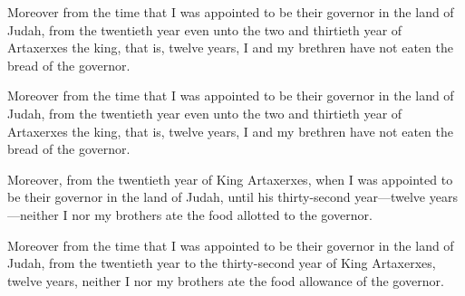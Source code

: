 			Moreover from the time that I was appointed to be their governor in the land of Judah, from the twentieth year even unto the two and thirtieth year of Artaxerxes the king, that is, twelve years, I and my brethren have not eaten the bread of the governor.

			\begin{versebox}
					\item[BHS] 
					\item[LXX] 
					\item[ASV] Moreover from the time that I was appointed to be their governor in the land of Judah, from the twentieth year even unto the two and thirtieth year of Artaxerxes the king, that is, twelve years, I and my brethren have not eaten the bread of the governor.
					\item[NIV] Moreover, from the twentieth year of King Artaxerxes, when I was appointed to be their governor in the land of Judah, until his thirty-second year—twelve years—neither I nor my brothers ate the food allotted to the governor.
					\item[NRSV] Moreover from the time that I was appointed to be their governor in the land of Judah, from the twentieth year to the thirty-second year of King Artaxerxes, twelve years, neither I nor my brothers ate the food allowance of the governor.
			\end{versebox}

